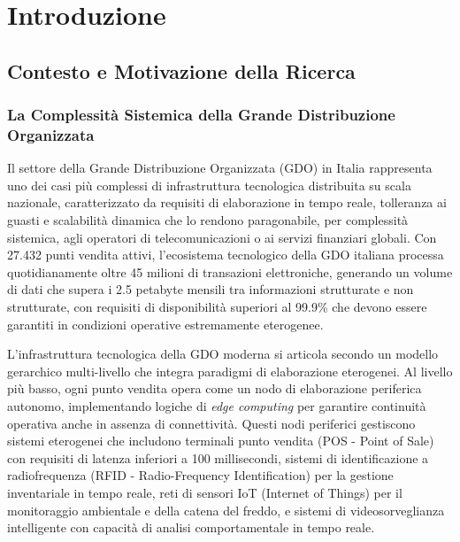 \chapter{Introduzione}
\label{cap1_introduction}

\section{Contesto e Motivazione della Ricerca}

\subsection{La Complessità Sistemica della Grande Distribuzione Organizzata}

Il settore della Grande Distribuzione Organizzata (GDO) in Italia rappresenta uno dei casi più complessi di infrastruttura tecnologica distribuita su scala nazionale, caratterizzato da requisiti di elaborazione in tempo reale, tolleranza ai guasti e scalabilità dinamica che lo rendono paragonabile, per complessità sistemica, agli operatori di telecomunicazioni o ai servizi finanziari globali. Con 27.432 punti vendita attivi\autocite{istat2024}, l'ecosistema tecnologico della GDO italiana processa quotidianamente oltre 45 milioni di transazioni elettroniche, generando un volume di dati che supera i 2.5 petabyte mensili tra informazioni strutturate e non strutturate, con requisiti di disponibilità superiori al 99.9\% che devono essere garantiti in condizioni operative estremamente eterogenee.

L'infrastruttura tecnologica della GDO moderna si articola secondo un modello gerarchico multi-livello che integra paradigmi di elaborazione eterogenei. Al livello più basso, ogni punto vendita opera come un nodo di elaborazione periferica autonomo, implementando logiche di \textit{edge computing} per garantire continuità operativa anche in assenza di connettività. Questi nodi periferici gestiscono sistemi eterogenei che includono terminali punto vendita (POS - Point of Sale) con requisiti di latenza inferiori a 100 millisecondi, sistemi di identificazione a radiofrequenza (RFID - Radio-Frequency Identification) per la gestione inventariale in tempo reale, reti di sensori IoT (Internet of Things) per il monitoraggio ambientale e della catena del freddo, e sistemi di videosorveglianza intelligente con capacità di analisi comportamentale in tempo reale.

